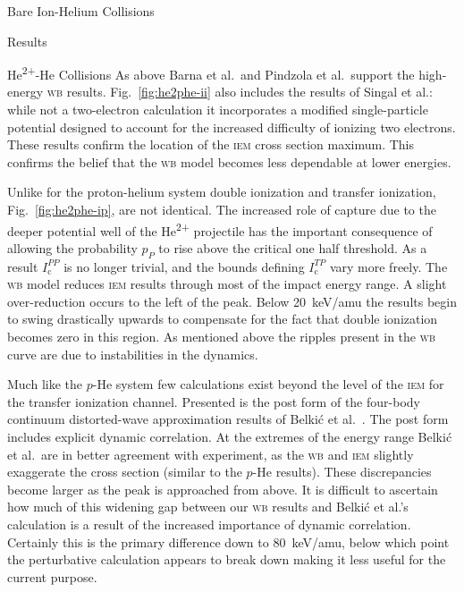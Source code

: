 \documentclass[letterpaper, 11 pt]{report}
\begin{document}
\begin{chapter}{Bare Ion-Helium Collisions \label{chap:p-he2p-he}}
\begin{section}{Results \label{sec:phe2p-res}}
\begin{subsection}{\texorpdfstring{He\textsuperscript{2+}}{He2+}-He Collisions
                         \label{sec:he2phe-res}}
         As above Barna et al.\ and Pindzola et al.\ support the high-energy \textsc{wb}
         results. Fig.~\ref{fig:he2phe-ii} also includes the results of Singal et al.: while not a
         two-electron calculation it incorporates a modified single-particle potential designed to
         account for the increased difficulty of ionizing two electrons. These results confirm the
         location of the \textsc{iem} cross section maximum. This confirms the belief that the
         \textsc{wb} model becomes less dependable at lower energies.

         Unlike for the proton-helium system double ionization and transfer ionization,
         Fig.~\ref{fig:he2phe-ip}, are not identical. The increased role of capture due to the deeper
         potential well of the He\textsuperscript{2+} projectile has the important consequence of
         allowing the probability $p_P$ to rise above the critical one half threshold. As a result
         $I^{PP}_\mathrm{c}$ is no longer trivial, and the bounds defining $I^{TP}_\mathrm{c}$ vary more
         freely. The \textsc{wb} model reduces \textsc{iem} results through most of the impact energy
         range. A slight over-reduction occurs to the left of the peak. Below 20~keV/amu the results
         begin to swing drastically upwards to compensate for the fact that double ionization becomes
         zero in this region. As mentioned above the ripples present in the \textsc{wb} curve are due to
         instabilities in the dynamics.

         Much like the $p$-He system few calculations exist beyond the level of the \textsc{iem} for the
         transfer ionization channel. Presented is the post form of the four-body continuum
         distorted-wave  approximation results of Belki\'{c} et al.~\cite{BMM-97}. The post form
         includes explicit dynamic correlation. At the extremes of the energy range Belki\'{c} et al.\
         are in better agreement with experiment, as the \textsc{wb} and \textsc{iem} slightly
         exaggerate the cross section (similar to the $p$-He results). These discrepancies become larger
         as the peak is approached from above. It is difficult to ascertain how much of this widening
         gap between our \textsc{wb} results and Belki\'{c} et al.'s calculation is a result of the
         increased importance of dynamic correlation. Certainly this is the primary difference down to
         80~keV/amu, below which point the perturbative calculation appears to break down making it less
         useful for the current purpose.


\end{subsection}
\end{section}
\end{chapter}
\end{document}
